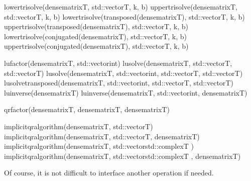 \documentclass[a4paper,11pt,english]{sphinxmanual}
\begin{document}
\begin{sphinxVerbatim}[commandchars=\\\{\}]
lower\PYGZus{}tri\PYGZus{}solve(dense\PYGZus{}matrix\PYGZlt{}T\PYGZgt{}, std::vector\PYGZlt{}T\PYGZgt{}, k, b)
upper\PYGZus{}tri\PYGZus{}solve(dense\PYGZus{}matrix\PYGZlt{}T\PYGZgt{}, std::vector\PYGZlt{}T\PYGZgt{}, k, b)
lower\PYGZus{}tri\PYGZus{}solve(transposed(dense\PYGZus{}matrix\PYGZlt{}T\PYGZgt{}), std::vector\PYGZlt{}T\PYGZgt{}, k, b)
upper\PYGZus{}tri\PYGZus{}solve(transposed(dense\PYGZus{}matrix\PYGZlt{}T\PYGZgt{}), std::vector\PYGZlt{}T\PYGZgt{}, k, b)
lower\PYGZus{}tri\PYGZus{}solve(conjugated(dense\PYGZus{}matrix\PYGZlt{}T\PYGZgt{}), std::vector\PYGZlt{}T\PYGZgt{}, k, b)
upper\PYGZus{}tri\PYGZus{}solve(conjugated(dense\PYGZus{}matrix\PYGZlt{}T\PYGZgt{}), std::vector\PYGZlt{}T\PYGZgt{}, k, b)

lu\PYGZus{}factor(dense\PYGZus{}matrix\PYGZlt{}T\PYGZgt{}, std::vector\PYGZlt{}int\PYGZgt{})
lu\PYGZus{}solve(dense\PYGZus{}matrix\PYGZlt{}T\PYGZgt{}, std::vector\PYGZlt{}T\PYGZgt{}, std::vector\PYGZlt{}T\PYGZgt{})
lu\PYGZus{}solve(dense\PYGZus{}matrix\PYGZlt{}T\PYGZgt{}, std::vector\PYGZlt{}int\PYGZgt{}, std::vector\PYGZlt{}T\PYGZgt{},
         std::vector\PYGZlt{}T\PYGZgt{})
lu\PYGZus{}solve\PYGZus{}transposed(dense\PYGZus{}matrix\PYGZlt{}T\PYGZgt{}, std::vector\PYGZlt{}int\PYGZgt{}, std::vector\PYGZlt{}T\PYGZgt{},
         std::vector\PYGZlt{}T\PYGZgt{})
lu\PYGZus{}inverse(dense\PYGZus{}matrix\PYGZlt{}T\PYGZgt{})
lu\PYGZus{}inverse(dense\PYGZus{}matrix\PYGZlt{}T\PYGZgt{}, std::vector\PYGZlt{}int\PYGZgt{}, dense\PYGZus{}matrix\PYGZlt{}T\PYGZgt{})

qr\PYGZus{}factor(dense\PYGZus{}matrix\PYGZlt{}T\PYGZgt{}, dense\PYGZus{}matrix\PYGZlt{}T\PYGZgt{}, dense\PYGZus{}matrix\PYGZlt{}T\PYGZgt{})

implicit\PYGZus{}qr\PYGZus{}algorithm(dense\PYGZus{}matrix\PYGZlt{}T\PYGZgt{}, std::vector\PYGZlt{}T\PYGZgt{})
implicit\PYGZus{}qr\PYGZus{}algorithm(dense\PYGZus{}matrix\PYGZlt{}T\PYGZgt{}, std::vector\PYGZlt{}T\PYGZgt{},
                      dense\PYGZus{}matrix\PYGZlt{}T\PYGZgt{})
implicit\PYGZus{}qr\PYGZus{}algorithm(dense\PYGZus{}matrix\PYGZlt{}T\PYGZgt{}, std::vector\PYGZlt{}std::complex\PYGZlt{}T\PYGZgt{} \PYGZgt{})
implicit\PYGZus{}qr\PYGZus{}algorithm(dense\PYGZus{}matrix\PYGZlt{}T\PYGZgt{}, std::vector\PYGZlt{}std::complex\PYGZlt{}T\PYGZgt{} \PYGZgt{},
                      dense\PYGZus{}matrix\PYGZlt{}T\PYGZgt{})
\end{sphinxVerbatim}

\sphinxAtStartPar
Of course, it is not difficult to interface another operation if needed.
\end{document}
